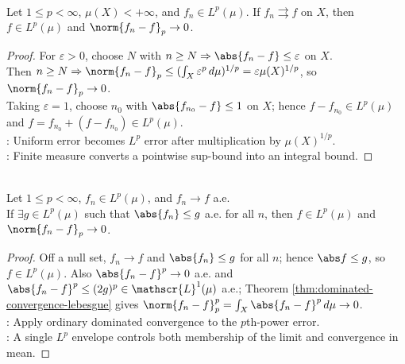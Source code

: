 \begin{proposition} \label{prop:uniform-to-lp-on-finite-measure} \\
Let $1\leq p<\infty$, $\mu(X)<+\infty$, and $f_n\in L^p(\mu)$. If $f_n\rightrightarrows f$ on $X$, then $f\in L^p(\mu)$ and $\norm{f_n-f}_p\to0$.
\begin{proof}
For $\varepsilon>0$, choose $N$ with $n\geq N\Rightarrow \abs{f_n-f}\leq\varepsilon$ on $X$.\\
Then $n\geq N\Rightarrow \norm{f_n-f}_p\leq(\int_X\varepsilon^p\,d\mu)^{1/p}=\varepsilon\mu(X)^{1/p}$, so $\norm{f_n-f}_p\to0$.\\
Taking $\varepsilon=1$, choose $n_0$ with $\abs{f_{n_0}-f}\leq1$ on $X$; hence $f-f_{n_0}\in L^p(\mu)$ and $f=f_{n_0}+(f-f_{n_0})\in L^p(\mu)$.\\
: Uniform error becomes $L^p$ error after multiplication by $\mu(X)^{1/p}$.\\
: Finite measure converts a pointwise sup-bound into an integral bound.
\end{proof}
\end{proposition}

\begin{theorem} \label{thm:dominated-ae-to-lp} \\
Let $1\leq p<\infty$, $f_n\in L^p(\mu)$, and $f_n\to f$ a.e.\\
If $\exists g\in L^p(\mu)$ such that $\abs{f_n}\leq g$ a.e. for all $n$, then $f\in L^p(\mu)$ and $\norm{f_n-f}_p\to0$.
\begin{proof}
Off a null set, $f_n\to f$ and $\abs{f_n}\leq g$ for all $n$; hence $\abs f\leq g$, so $f\in L^p(\mu)$. Also $\abs{f_n-f}^p\to0$ a.e. and $\abs{f_n-f}^p\leq(2g)^p\in\mathscr{L}^1(\mu)$ a.e.; Theorem \ref{thm:dominated-convergence-lebesgue} gives $\norm{f_n-f}_p^p=\int_X\abs{f_n-f}^p\,d\mu\to0$.\\
: Apply ordinary dominated convergence to the $p$th-power error.\\
: A single $L^p$ envelope controls both membership of the limit and convergence in mean.
\end{proof}
\end{theorem}

